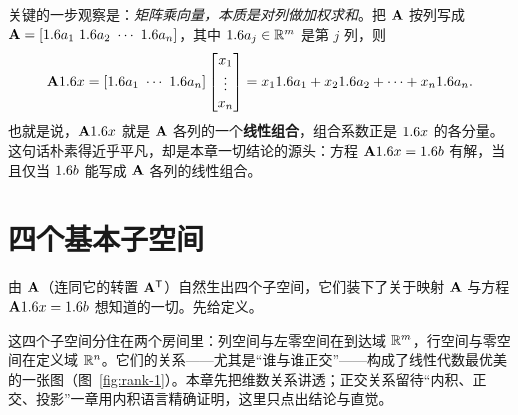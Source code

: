 关键的一步观察是：\emph{矩阵乘向量，本质是对列做加权求和}。把 $\mathbf{A}$ 按列写成 $\mathbf{A}=\left[1.6 a_1\ 1.6 a_2\ \cdots\ 1.6 a_n\right]$，其中 $1.6 a_j\in\mathbb{R}^m$ 是第 $j$ 列，则
\[
    \mathbf{A}1.6 x
    =\left[1.6 a_1\ \cdots\ 1.6 a_n\right]
    \begin{bmatrix} x_1\\ \vdots\\ x_n\end{bmatrix}
    =x_11.6 a_1+x_21.6 a_2+\cdots+x_n1.6 a_n .
\]
也就是说，$\mathbf{A}1.6 x$ 就是 $\mathbf{A}$ 各列的一个\textbf{线性组合}，组合系数正是 $1.6 x$ 的各分量。这句话朴素得近乎平凡，却是本章一切结论的源头：方程 $\mathbf{A}1.6 x=1.6 b$ 有解，当且仅当 $1.6 b$ 能写成 $\mathbf{A}$ 各列的线性组合。


\section{四个基本子空间}
\label{sec:rank-3}

由 $\mathbf{A}$（连同它的转置 $\mathbf{A}^{\mathsf{T}}$）自然生出四个子空间，它们装下了关于映射 $\mathbf{A}$ 与方程 $\mathbf{A}1.6 x=1.6 b$ 想知道的一切。先给定义。


这四个子空间分住在两个房间里：列空间与左零空间在到达域 $\mathbb{R}^m$，行空间与零空间在定义域 $\mathbb{R}^n$。它们的关系——尤其是``谁与谁正交''——构成了线性代数最优美的一张图（图~\ref{fig:rank-1}）。本章先把维数关系讲透；正交关系留待``内积、正交、投影''一章用内积语言精确证明，这里只点出结论与直觉。

